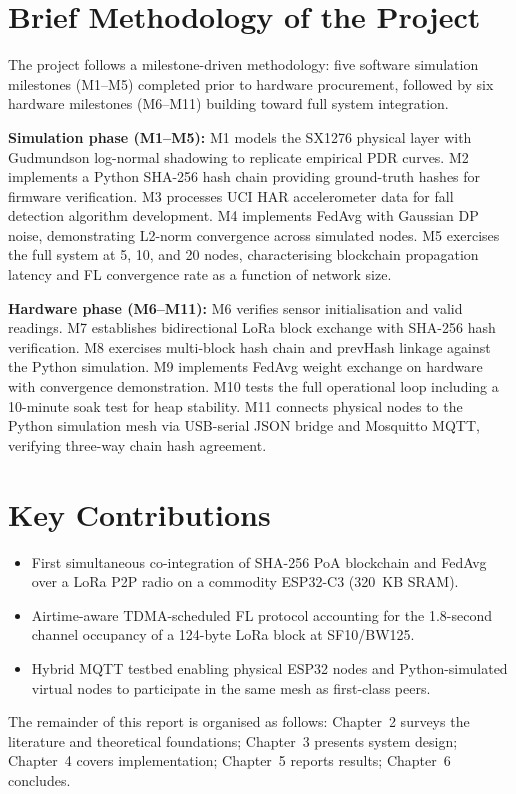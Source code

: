 \section{Brief Methodology of the Project}

The project follows a milestone-driven methodology: five software simulation milestones (M1--M5) completed prior to hardware procurement, followed by six hardware milestones (M6--M11) building toward full system integration.

\textbf{Simulation phase (M1--M5):} M1 models the SX1276 physical layer with Gudmundson log-normal shadowing to replicate empirical PDR curves. M2 implements a Python SHA-256 hash chain providing ground-truth hashes for firmware verification. M3 processes UCI HAR accelerometer data \cite{UCI_HAR_dataset} for fall detection algorithm development. M4 implements FedAvg with Gaussian DP noise, demonstrating L2-norm convergence across simulated nodes. M5 exercises the full system at 5, 10, and 20 nodes, characterising blockchain propagation latency and FL convergence rate as a function of network size.

\textbf{Hardware phase (M6--M11):} M6 verifies sensor initialisation and valid readings. M7 establishes bidirectional LoRa block exchange with SHA-256 hash verification. M8 exercises multi-block hash chain and prevHash linkage against the Python simulation. M9 implements FedAvg weight exchange on hardware with convergence demonstration. M10 tests the full operational loop including a 10-minute soak test for heap stability. M11 connects physical nodes to the Python simulation mesh via USB-serial JSON bridge and Mosquitto MQTT, verifying three-way chain hash agreement.

\section{Key Contributions}

\begin{itemize}
\item First simultaneous co-integration of SHA-256 PoA blockchain and FedAvg over a LoRa P2P radio on a commodity ESP32-C3 (320~KB SRAM).
\item Airtime-aware TDMA-scheduled FL protocol accounting for the 1.8-second channel occupancy of a 124-byte LoRa block at SF10/BW125.
\item Hybrid MQTT testbed enabling physical ESP32 nodes and Python-simulated virtual nodes to participate in the same mesh as first-class peers.
\end{itemize}

The remainder of this report is organised as follows: Chapter~2 surveys the literature and theoretical foundations; Chapter~3 presents system design; Chapter~4 covers implementation; Chapter~5 reports results; Chapter~6 concludes.
